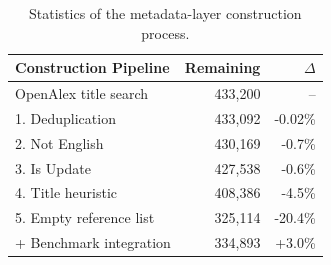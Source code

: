\begin{table}[t]
\centering
\sffamily
\renewcommand{\arraystretch}{1}
\caption{Statistics of the metadata-layer construction process.}
\begin{tabular*}{\columnwidth}{@{\extracolsep{\fill}}lrr}
\toprule
\textbf{Construction Pipeline} & \textbf{Remaining} & $\Delta$ \\
\midrule
OpenAlex title search & 433{,}200 & -- \\
1. Deduplication & 433{,}092 & -0.02\% \\
2. Not English & 430{,}169 & -0.7\% \\
3. Is Update & 427{,}538 & -0.6\% \\
4. Title heuristic & 408{,}386 & -4.5\% \\
5. Empty reference list & 325{,}114 & -20.4\% \\
\midrule
+ Benchmark integration & 334{,}893 & +3.0\% \\
\bottomrule
\end{tabular*}
\label{tab:sr4all-metadata-filtering}
\end{table}
